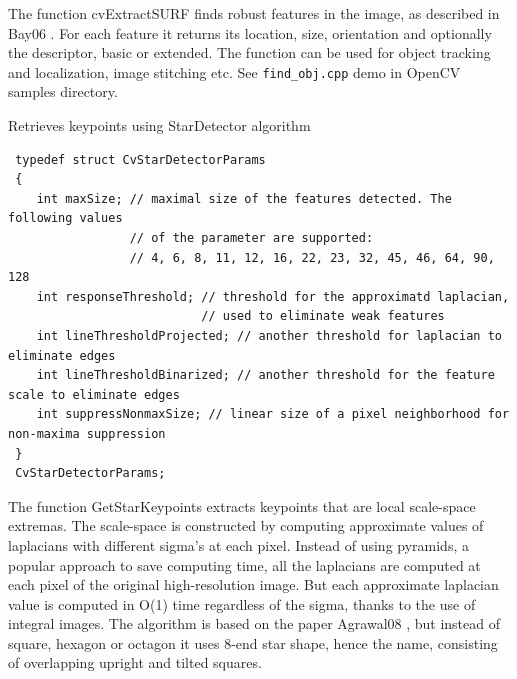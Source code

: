 The function cvExtractSURF finds robust features in the image, as
described in
Bay06
. For each feature it returns its location, size,
orientation and optionally the descriptor, basic or extended. The function
can be used for object tracking and localization, image stitching etc. See
\texttt{find\_obj.cpp} demo in OpenCV samples directory.

\label{GetStarKeypoints}

Retrieves keypoints using StarDetector algorithm


\begin{description}
\begin{lstlisting}
 typedef struct CvStarDetectorParams
 {
    int maxSize; // maximal size of the features detected. The following values
                 // of the parameter are supported:
                 // 4, 6, 8, 11, 12, 16, 22, 23, 32, 45, 46, 64, 90, 128
    int responseThreshold; // threshold for the approximatd laplacian,
                           // used to eliminate weak features
    int lineThresholdProjected; // another threshold for laplacian to eliminate edges
    int lineThresholdBinarized; // another threshold for the feature scale to eliminate edges
    int suppressNonmaxSize; // linear size of a pixel neighborhood for non-maxima suppression
 }
 CvStarDetectorParams;
\end{lstlisting}
\end{description}

The function GetStarKeypoints extracts keypoints that are local
scale-space extremas. The scale-space is constructed by computing
approximate values of laplacians with different sigma's at each
pixel. Instead of using pyramids, a popular approach to save computing
time, all the laplacians are computed at each pixel of the original
high-resolution image. But each approximate laplacian value is computed
in O(1) time regardless of the sigma, thanks to the use of integral
images. The algorithm is based on the paper 
Agrawal08
, but instead
of square, hexagon or octagon it uses 8-end star shape, hence the name,
consisting of overlapping upright and tilted squares.

